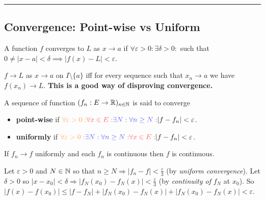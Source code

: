 \vspace{-6ex}
\noindent\rule{\linewidth}{0.5pt}\vspace{-2ex}

\begin{multicols}{2}
\subsection*{Convergence: Point-wise vs Uniform}

\begin{definition}
A function $f$ converges to $L$ as $x\to a$ if $\forall\varepsilon>0:\exists\delta>0:$ such that $0\neq |x-a|<\delta\implies|f(x)-L|<\varepsilon$.
\end{definition}

\begin{theorem}[3.6]
$f\to L$ as $x\to a$ on $I\setminus\{a\}$ iff for every sequence such that $x_n\to a$ we have $f(x_n)\to L$. \textbf{This is a good way of disproving convergence.}
\end{theorem}

\begin{definition}[Convergence]
A sequence of function $(f_n:E\to\mathbb{R})_{n\in\mathbb{N}}$ is said to converge
\begin{itemize}
    \item{\textbf{point-wise} if ${\color{orange!75}\forall\varepsilon>0:} {\color{red!65}\forall x\in E:}{\color{blue!65}\exists N:\forall n\geq N:} |f-f_n|<\varepsilon$.}
    \item{\textbf{uniformly} if ${\color{orange!75}\forall\varepsilon>0:}{\color{blue!65}\exists N:\forall n\geq N: }{\color{red!65}\forall x\in E:} |f-f_n|<\varepsilon$.}
\end{itemize}
\end{definition}

\begin{theorem}[7.9]
If $f_n\to f$ uniformly and each $f_n$ is continuous then $f$ is continuous.
\end{theorem}
\begin{proof1}
Let $\varepsilon>0$ and $N\in\mathbb{N}$ so that $n\geq N \Rightarrow |f_n-f|<\frac{\varepsilon}{3}$ (by \textit{uniform convergence}). Let $\delta>0$ so $|x-x_0|<\delta\Rightarrow|f_N(x_0)-f_N(x)|<\frac{\varepsilon}{3}$ (by \textit{continuity of} $f_N$ at $x_0$). So $|f(x)-f(x_0)|\leq|f-f_N|+|f_N(x_0)-f_N(x)|+|f_N(x_0)-f_N(x)|<\varepsilon$. 
\end{proof1}


\end{multicols}
